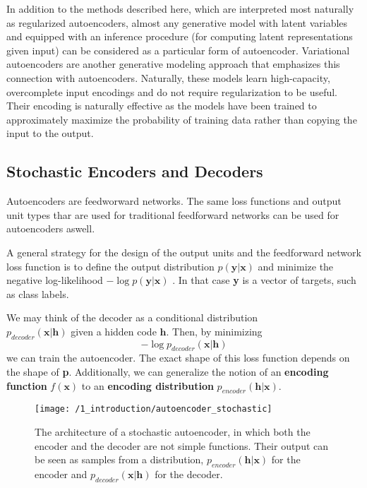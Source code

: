 In addition to the methods described here, which are interpreted most naturally
as regularized autoencoders, almost any generative model with latent variables
and equipped with an inference procedure (for computing latent representations
given input) can be considered as a particular form of autoencoder. Variational
autoencoders are another generative modeling approach that emphasizes this
connection with autoencoders. Naturally, these models learn high-capacity,
overcomplete input encodings and do not require regularization to be useful.
Their encoding is naturally effective as the models have been trained to
approximately maximize the probability of training data rather than copying the
input to the output. 

\subsection{Stochastic Encoders and Decoders}
Autoencoders are feedworward networks. The same loss functions and output unit
types thar are used for traditional feedforward networks can be used for
autoencoders aswell.

A general strategy for the design of the output units and the feedforward
network loss function is to define the output distribution
$p(\textbf{y}|\textbf{x})$ and minimize the negative log-likelihood $-\log
p(\textbf{y}|\textbf{x})$ . In that case \textbf{y} is a vector of targets, such
as class labels.

We may think of the decoder as a conditional distribution \\
$p_{decoder}(\textbf{x}|\textbf{h})$ given a hidden code $\textbf{h}$. Then, by
minimizing 
\begin{equation}
    -\log p_{decoder}(\textbf{x}|\textbf{h})
\end{equation}
we can train the autoencoder. The exact shape of this loss function depends on
the shape of \textbf{p}. Additionally, we can generalize the notion of an
\textbf{encoding function} $f(\textbf{x})$ to an \textbf{encoding distribution}
$p_{encoder}(\textbf{h}|\textbf{x})$.

\begin{figure}
	\centering
	\texttt{[image: /1\_introduction/autoencoder\_stochastic]}
    \caption{The architecture of a stochastic autoencoder, in which both the
    encoder and the decoder are not simple functions. Their output can be seen
    as samples from a distribution, $p_{encoder}(\textbf{h}|\textbf{x})$ for the
    encoder and $p_{decoder}(\textbf{x}|\textbf{h})$ for the decoder.} 
	\label{fig:autoencoder}
\end{figure}

